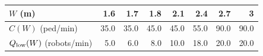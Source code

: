 \begin{tabular}{lrrrrrrr}
\toprule
$W$ (m) & 1.6 & 1.7 & 1.8 & 2.1 & 2.4 & 2.7 & 3 \\
\midrule
$C(W)$ (ped/min) & 35.0 & 35.0 & 45.0 & 45.0 & 55.0 & 90.0 & 90.0 \\
$Q_{\rm low}(W)$ (robots/min) & 5.0 & 6.0 & 8.0 & 10.0 & 18.0 & 20.0 & 20.0 \\
\bottomrule
\end{tabular}
